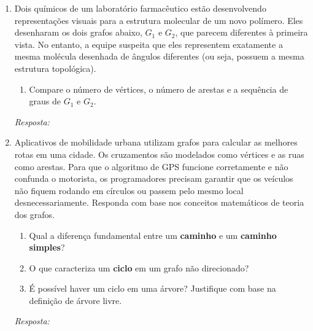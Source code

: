 \documentclass[12pt]{article}
\newcommand{\quadro}[1]{\vspace{0.2cm}\begin{tcolorbox}[colback=white, colframe=black, height=#1, boxrule=0.5pt, arc=0pt] \textit{Resposta:} \end{tcolorbox}}
\begin{document}
\begin{enumerate}[label=\arabic*), leftmargin=1.5cm, itemsep=0.8cm]
\item Dois químicos de um laboratório farmacêutico estão desenvolvendo representações visuais para a estrutura molecular de um novo polímero. Eles desenharam os dois grafos abaixo, $G_1$ e $G_2$, que parecem diferentes à primeira vista. No entanto, a equipe suspeita que eles representem exatamente a mesma molécula desenhada de ângulos diferentes (ou seja, possuem a mesma estrutura topológica).
\begin{center}
\end{center}
\begin{enumerate}[label=\alph*)]
    \item Compare o número de vértices, o número de arestas e a sequência de graus de $G_1$ e $G_2$.
\end{enumerate}
\quadro{6cm}

\item Aplicativos de mobilidade urbana utilizam grafos para calcular as melhores rotas em uma cidade. Os cruzamentos são modelados como vértices e as ruas como arestas. Para que o algoritmo de GPS funcione corretamente e não confunda o motorista, os programadores precisam garantir que os veículos não fiquem rodando em círculos ou passem pelo mesmo local desnecessariamente. Responda com base nos conceitos matemáticos de teoria dos grafos.
\begin{enumerate}[label=\alph*)]
    \item Qual a diferença fundamental entre um \textbf{caminho} e um \textbf{caminho simples}?
    \item O que caracteriza um \textbf{ciclo} em um grafo não direcionado?
    \item É possível haver um ciclo em uma árvore? Justifique com base na definição de árvore livre.
\end{enumerate}
\quadro{6cm}


\end{enumerate}
\end{document}
